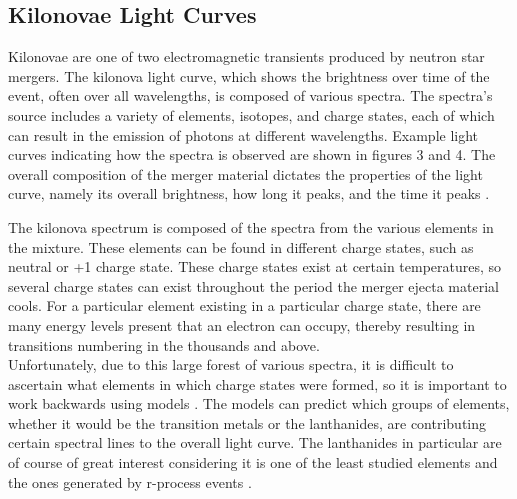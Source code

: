\documentclass[11pt,a4paper]{article}
\begin{document}
\subsection{Kilonovae Light Curves}

Kilonovae are one of two electromagnetic transients produced by neutron star mergers. The kilonova light curve, which shows the brightness over time of the event, often over all wavelengths, is composed of various spectra. The spectra's source includes a variety of elements, isotopes, and charge states, each of which can result in the emission of photons at different wavelengths. Example light curves indicating how the spectra is observed are shown in figures 3 and 4. The overall composition of the merger material dictates the properties of the light curve, namely its overall brightness, how long it peaks, and the time it peaks \cite{Nicholl_2017}.

The kilonova spectrum is composed of the spectra from the various elements in the mixture. These elements can be found in different charge states, such as neutral or +1 charge state. These charge states exist at certain temperatures, so several charge states can exist throughout the period the merger ejecta material cools. For a particular element existing in a particular charge state, there are many energy levels present that an electron can occupy, thereby resulting in transitions numbering in the thousands and above.\\

Unfortunately, due to this large forest of various spectra, it is difficult to ascertain what elements in which charge states were formed, so it is important to work backwards using models \cite{Nicholl_2017} . The models can predict which groups of elements, whether it would be the transition metals or the lanthanides, are contributing certain spectral lines to the overall light curve. The lanthanides in particular are of course of great interest considering it is one of the least studied elements and the ones generated by r-process events \cite{Barnes_Kasen_2013} .
\end{document}
